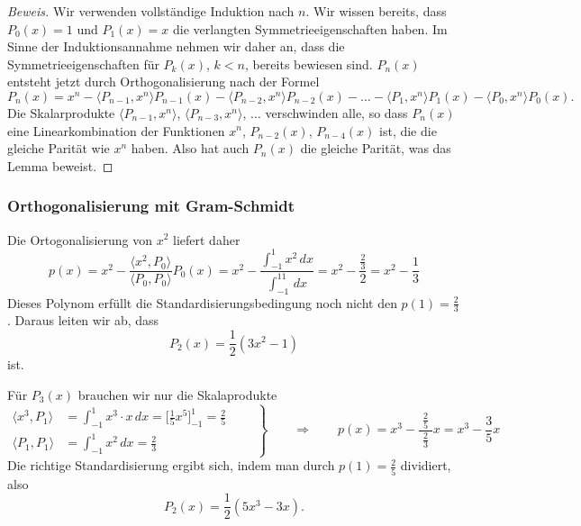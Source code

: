 \begin{proof}[Beweis]
Wir verwenden vollständige Induktion nach $n$.
Wir wissen bereits, dass $P_0(x)=1$ und $P_1(x)=x$ die verlangten
Symmetrieeigenschaften haben.
Im Sinne der Induktionsannahme nehmen wir daher an, dass die
Symmetrieeigenschaften für $P_k(x)$, $k<n$, bereits bewiesen sind.
$P_n(x)$ entsteht jetzt durch Orthogonalisierung nach der Formel
\[
P_n(x)
=
x^n
-
\langle P_{n-1},x^n\rangle P_{n-1}(x)
-
\langle P_{n-2},x^n\rangle P_{n-2}(x)
-\dots-
\langle P_1,x^n\rangle P_1(x)
-
\langle P_0,x^n\rangle P_0(x).
\]
Die Skalarprodukte
$\langle P_{n-1},x^n\rangle$,
$\langle P_{n-3},x^n\rangle$, $\dots$ verschwinden alle, so dass
$P_n(x)$ eine Linearkombination der Funktionen $x^n$, $P_{n-2}(x)$,
$P_{n-4}(x)$ ist, die die gleiche Parität wie $x^n$ haben.
Also hat auch $P_n(x)$ die gleiche Parität, was das Lemma beweist.
\end{proof}

%
%
\subsubsection{Orthogonalisierung mit Gram-Schmidt}
Die Ortogonalisierung von $x^2$ liefert daher
\[
p(x) = x^2
-
\frac{\langle x^2,P_0\rangle}{\langle P_0,P_0\rangle} P_0(x)
=
x^2 - \frac{\int_{-1}^1x^2\,dx}{\int_{-1}^11\,dx}
=
x^2 - \frac{\frac{2}{3}}{2}=x^2-\frac13
\]
Dieses Polynom erfüllt die Standardisierungsbedingung noch 
nicht den $p(1)=\frac23$.
Daraus leiten wir ab, dass
\[
P_2(x) = \frac12(3x^2-1)
\]
ist.

Für $P_3(x)$ brauchen wir nur die Skalaprodukte
\[
\left.
\begin{aligned}
\langle x^3,P_1\rangle
&=
\int_{-1}^1  x^3\cdot x\,dx
=
\biggl[\frac15x^5\biggr]_{-1}^1
=
\frac25
\qquad
\\
\langle P_1,P_1\rangle
&=
\int_{-1}^1 x^2\,dx
=
\frac23
\end{aligned}
\right\}
\qquad
\Rightarrow
\qquad
p(x) = x^3 - \frac{\;\frac25\;}{\frac23}x=x^3-\frac{3}{5}x
\]
Die richtige Standardisierung ergibt sich,
indem man durch $p(1)=\frac25$ dividiert, also
\[
P_2(x) = \frac12(5x^3-3x).
\]

